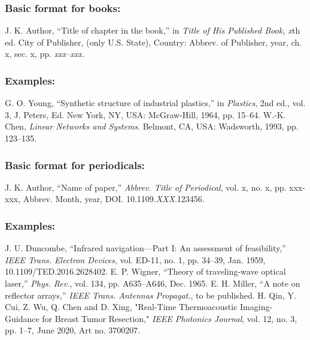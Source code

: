 \documentclass{IEEEoj}
\begin{document}
\subsubsection*{Basic format for books:}

\begin{thebibliography}{00}
 J. K. Author, ``Title of chapter in the book,'' in \textit{Title of His Published Book, x}th ed. City of Publisher,
(only U.S. State), Country: Abbrev. of Publisher, year, ch. x, sec. x, pp.
\textit{xxx--xxx.}
\end{thebibliography}

\subsubsection*{Examples:}

\begin{thebibliography}{00}
 G. O. Young, ``Synthetic structure of industrial
plastics,'' in \emph{Plastics}, 2nd ed., vol. 3, J. Peters, Ed. New York, NY, USA: McGraw-Hill, 1964, pp. 15--64.
 W.-K. Chen, \emph{Linear Networks and Systems}. Belmont, CA, USA: Wadsworth, 1993, pp. 123--135.
\end{thebibliography}

\subsubsection*{Basic format for periodicals:}

\begin{thebibliography}{00}
 J. K. Author, ``Name of paper,'' \textit{Abbrev. Title of Periodical}, vol. x, no. x, pp. xxx-xxx, Abbrev. Month, year, DOI.
10.1109.\textit{XXX}.123456.
\end{thebibliography}

\subsubsection*{Examples:}

\begin{thebibliography}{00}
 J. U. Duncombe, ``Infrared navigation---Part I: An
assessment of feasibility,'' \emph{IEEE Trans. Electron Devices}, vol. ED-11, no. 1, pp. 34--39, Jan. 1959, 10.1109/TED.2016.2628402.
 E. P. Wigner, ``Theory of traveling-wave optical laser,'' 
\emph{Phys. Rev.}, vol. 134, pp. A635--A646, Dec. 1965.
 E. H. Miller, ``A note on reflector arrays,'' \emph{IEEE
Trans. Antennas Propagat.}, to be published.
 H. Qin, Y. Cui, Z. Wu, Q. Chen and D. Xing, "Real-Time
Thermoacoustic Imaging-Guidance for Breast Tumor Resection," \emph{IEEE Photonics Journal}, vol. 12, no. 3, pp. 1--7, June 2020, Art no. 3700207.
\end{thebibliography}
\end{document}
